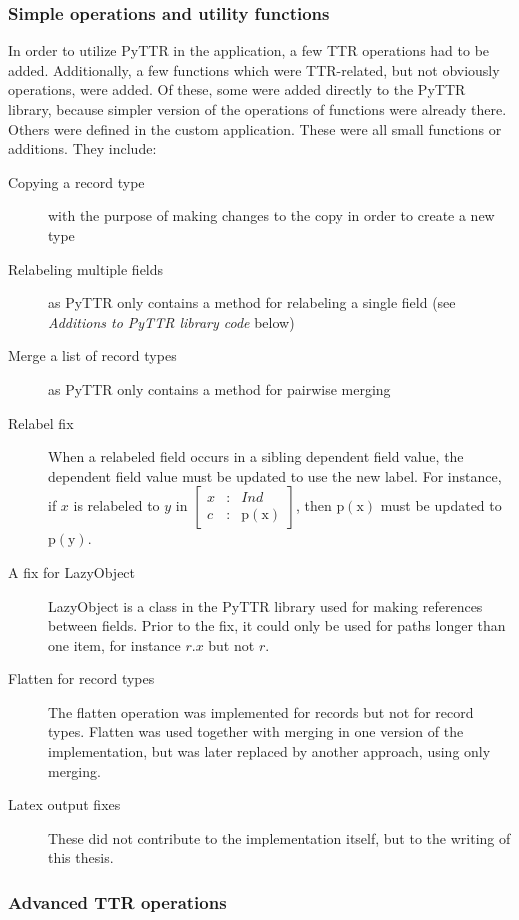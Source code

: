 \subsubsection{Simple operations and utility functions}

In order to utilize PyTTR in the application, a few TTR operations had to be added.
Additionally, a few functions which were TTR-related, but not obviously operations, were added.
Of these, some were added directly to the PyTTR library, because simpler version of the operations of functions were already there.
Others were defined in the custom application.
These were all small functions or additions.
They include:

\begin{description}
\item[Copying a record type] with the purpose of making changes to the copy in order to create a new type
\item[Relabeling multiple fields] as PyTTR only contains a method for relabeling a single field (see \textit{Additions to PyTTR library code} below)
\item[Merge a list of record types] as PyTTR only contains a method for pairwise merging
\item[Relabel fix] When a relabeled field occurs in a sibling dependent field value, the dependent field value must be updated to use the new label. For instance, if $x$ is relabeled to $y$ in $\left[ \begin{array}{rcl}x &:& Ind \\ c &:& \text{p}(\text{x}) \end{array}\right]$, then $\text{p}(\text{x})$ must be updated to $\text{p}(\text{y})$.
\item[A fix for LazyObject] LazyObject is a class in the PyTTR library used for making references between fields. Prior to the fix, it could only be used for paths longer than one item, for instance $r.x$ but not $r$.
\item[Flatten for record types] The flatten operation was implemented for records but not for record types. Flatten was used together with merging in one version of the implementation, but was later replaced by another approach, using only merging.
\item[Latex output fixes] These did not contribute to the implementation itself, but to the writing of this thesis.
\end{description}



\subsubsection{Advanced TTR operations}

